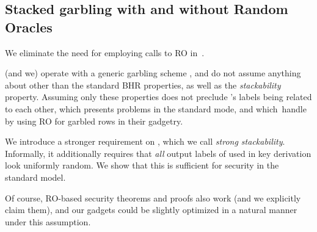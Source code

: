 





\subsection{Stacked garbling with and without Random Oracles}
\label{sec:techOverviewRO}


We eliminate the need for employing calls to RO in~\HK.   

\HK (and we) operate with a generic garbling scheme \underscheme, and do not assume anything about \underscheme other than the standard BHR properties, as well as the {\em stackability} property.  Assuming only  these properties does not preclude \underscheme's labels being related to each other, which presents problems in the standard mode, and which~\HK handle by using RO for garbled rows in their gadgetry.

We introduce a stronger requirement on \underscheme, which we call {\em strong stackability}.  Informally, it additionally requires that {\em all} output labels of \underscheme used in key derivation look uniformly random.  We show that this is sufficient for security in the standard model.

Of course, RO-based security theorems and proofs also work (and we explicitly claim them), and our gadgets could be slightly optimized in a natural manner under this assumption.





